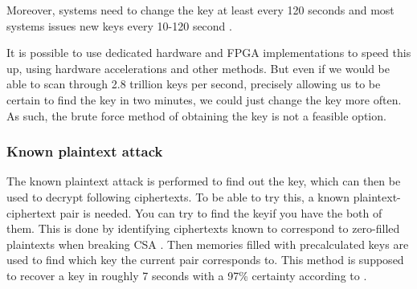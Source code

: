 Moreover, systems need to change the key at least every 120 seconds 
\citep{Simpson:2009} and most systems issues new keys every 10-120 
second \citep{Wirt:2004}.

It is possible to use dedicated hardware and FPGA implementations to 
speed this up, using hardware accelerations and other methods. But even 
if we would be able to scan through 2.8 trillion keys per second, 
precisely allowing us to be certain to find the key in two minutes, we 
could just change the key more often. As such, the brute force method 
of obtaining the key is not a feasible option.

\subsubsection{Known plaintext attack}
The known plaintext attack is performed to find out the key, which can 
then be used to decrypt following ciphertexts. To be able to try this, 
a known plaintext-ciphertext pair is needed. You can try to find the keyif you have the both of them. This is done by identifying ciphertexts 
known to correspond to zero-filled plaintexts when breaking CSA 
\citep{Breaking:2012}. Then memories filled with precalculated keys are 
used to find which key the current pair corresponds to. This method is 
supposed to recover a key in roughly 7 seconds with a 97\% certainty 
according to \citet{Breaking:2012}.
